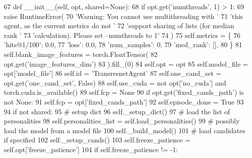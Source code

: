 \begin{DoxyCode}
67     \textcolor{keyword}{def }\_\_init\_\_(self, opt, shared=None):
68         \textcolor{keywordflow}{if} opt.get(\textcolor{stringliteral}{'numthreads'}, 1) > 1:
69             \textcolor{keywordflow}{raise} RuntimeError(
70                 \textcolor{stringliteral}{'Warning: You cannot use multithreading with '}
71                 \textcolor{stringliteral}{'this agent, as the current metrics do not '}
72                 \textcolor{stringliteral}{'support sharing of lists (for median rank '}
73                 \textcolor{stringliteral}{'calculation). Please set --numthreads to 1'}
74             )
75         self.metrics = \{
76             \textcolor{stringliteral}{'hits@1/100'}: 0.0,
77             \textcolor{stringliteral}{'loss'}: 0.0,
78             \textcolor{stringliteral}{'num\_samples'}: 0,
79             \textcolor{stringliteral}{'med\_rank'}: [],
80         \}
81         self.blank\_image\_features = torch.FloatTensor(
82             opt.get(\textcolor{stringliteral}{'image\_features\_dim'})
83         ).fill\_(0)
84         self.opt = opt
85         self.model\_file = opt[\textcolor{stringliteral}{'model\_file'}]
86         self.id = \textcolor{stringliteral}{'TransresnetAgent'}
87         self.one\_cand\_set = opt.get(\textcolor{stringliteral}{'one\_cand\_set'}, \textcolor{keyword}{False})
88         self.use\_cuda = \textcolor{keywordflow}{not} opt[\textcolor{stringliteral}{'no\_cuda'}] \textcolor{keywordflow}{and} torch.cuda.is\_available()
89         self.fcp = \textcolor{keywordtype}{None}
90         \textcolor{keywordflow}{if} opt.get(\textcolor{stringliteral}{'fixed\_cands\_path'}) \textcolor{keywordflow}{is} \textcolor{keywordflow}{not} \textcolor{keywordtype}{None}:
91             self.fcp = opt[\textcolor{stringliteral}{'fixed\_cands\_path'}]
92         self.episode\_done = \textcolor{keyword}{True}
93 
94         \textcolor{keywordflow}{if} \textcolor{keywordflow}{not} shared:
95             \textcolor{comment}{# setup dict}
96             self.\_setup\_dict()
97             \textcolor{comment}{# load the list of personalities}
98             self.personalities\_list = self.load\_personalities()
99             \textcolor{comment}{# possibly load the model from a model file}
100             self.\_build\_model()
101             \textcolor{comment}{# load candidates if specified}
102             self.\_setup\_cands()
103             self.freeze\_patience = self.opt[\textcolor{stringliteral}{'freeze\_patience'}]
104             \textcolor{keywordflow}{if} self.freeze\_patience != -1:

\end{DoxyCode}
